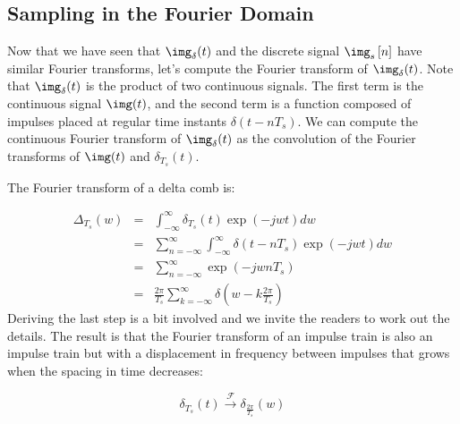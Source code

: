 


\subsection{Sampling in the Fourier Domain}

Now that we have seen that $\img_{\delta} (t)$ and the discrete signal $\img_s  \left[n \right]$ have similar Fourier transforms, let's compute the Fourier transform of $\img_{\delta} (t)$. Note that $\img_{\delta} (t)$ is the product of two continuous signals. The first term is the continuous signal $\img(t)$, and the second term is a function composed of impulses placed at regular time instants $\delta(t-n T_s)$. We can compute the continuous Fourier transform of $\img_{\delta} (t)$ as the convolution of the Fourier transforms of $\img(t)$ and $\delta_{T_s}(t)$.



The Fourier transform of a delta comb is:


\begin{eqnarray}
    \Delta_{T_s} (w) &=& \int_{-\infty}^{\infty}  \delta_{T_s}(t) \exp \left(-jwt\right) dw \nonumber \\
    &=&\sum_{n=-\infty}^{\infty} \int_{-\infty}^{\infty}  \delta(t-n T_s) \exp \left(-jwt\right) dw \nonumber \\
    &=&\sum_{n=-\infty}^{\infty}  \exp \left(-jwnT_s\right) \nonumber \\
    &=& \frac{2\pi}{T_s} \sum_{k=-\infty}^{\infty} \delta \left(w-k \frac{2 \pi}{T_s} \right)
\end{eqnarray}
Deriving the last step is a bit involved and we invite the readers to work out the details. The result is that the Fourier transform of an impulse train is also an impulse train but with a displacement in frequency between impulses that grows when the spacing in time decreases:

\begin{equation}
    \delta_{T_s}(t)
    \xrightarrow{\mathscr{F}}
    \delta_{\frac{2 \pi}{T_s}}(w)
\end{equation}



